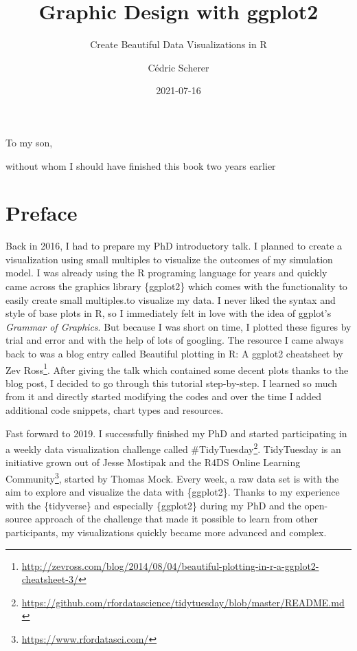 \documentclass[
]{krantz}
\title{Graphic Design with ggplot2}
\subtitle{Create Beautiful Data Visualizations in R}
\author{Cédric Scherer}
\date{2021-07-16}
\renewcommand{\href}[2]{#2\footnote{\url{#1}}}
\begin{document}
\maketitle


\thispagestyle{empty}

\begin{center}
To my son,

without whom I should have finished this book two years earlier
\end{center}

\setlength{\abovedisplayskip}{-5pt}
\setlength{\abovedisplayshortskip}{-5pt}

{
\hypersetup{linkcolor=}
\setcounter{tocdepth}{2}
\tableofcontents
}
\listoftables
\listoffigures
\hypertarget{preface}{%
\chapter*{Preface}\label{preface}}


Back in 2016, I had to prepare my PhD introductory talk. I planned to create a visualization using small multiples to visualize the outcomes of my simulation model. I was already using the R programing language for years and quickly came across the graphics library \{ggplot2\} which comes with the functionality to easily create small multiples.to visualize my data. I never liked the syntax and style of base plots in R, so I immediately felt in love with the idea of ggplot's \emph{Grammar of Graphics}. But because I was short on time, I plotted these figures by trial and error and with the help of lots of googling. The resource I came always back to was a blog entry called \href{http://zevross.com/blog/2014/08/04/beautiful-plotting-in-r-a-ggplot2-cheatsheet-3/}{Beautiful plotting in R: A ggplot2 cheatsheet by Zev Ross}. After giving the talk which contained some decent plots thanks to the blog post, I decided to go through this tutorial step-by-step. I learned so much from it and directly started modifying the codes and over the time I added additional code snippets, chart types and resources.

Fast forward to 2019. I successfully finished my PhD and started participating in a weekly data visualization challenge called \href{https://github.com/rfordatascience/tidytuesday/blob/master/README.md}{\#TidyTuesday}. TidyTuesday is an initiative grown out of Jesse Mostipak and the \href{https://www.rfordatasci.com/}{R4DS Online Learning Community}, started by Thomas Mock. Every week, a raw data set is with the aim to explore and visualize the data with \{ggplot2\}. Thanks to my experience with the \{tidyverse\} and especially \{ggplot2\} during my PhD and the open-source approach of the challenge that made it possible to learn from other participants, my visualizations quickly became more advanced and complex.
\end{document}
